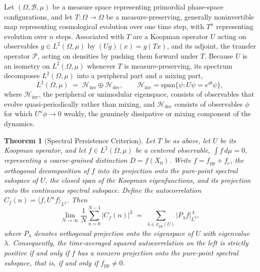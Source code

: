 \documentclass[11pt]{article}
\newtheorem{theorem}{Theorem}
\begin{document}
Let $(\Omega, \mathcal B, \mu)$ be a measure space representing primordial phase-space configurations, and let $T : \Omega \to \Omega$ be a measure-preserving, generally noninvertible map representing cosmological evolution over one time step, with $T^n$ representing evolution over $n$ steps. Associated with $T$ are a Koopman operator $U$ acting on observables $g \in L^2(\Omega, \mu)$ by $(Ug)(x) = g(Tx)$, and its adjoint, the transfer operator $\mathcal P$, acting on densities by pushing them forward under $T$. Because $U$ is an isometry on $L^2(\Omega, \mu)$ whenever $T$ is measure-preserving, its spectrum decomposes $L^2(\Omega, \mu)$ into a peripheral part and a mixing part,
\begin{equation}
L^2(\Omega, \mu) \;=\; \mathcal H_{\mathrm{inv}} \oplus \mathcal H_{\mathrm{dec}}, \qquad \mathcal H_{\mathrm{inv}} = \mathrm{span}\{\psi : U\psi = e^{i\theta}\psi\},
\end{equation}
where $\mathcal H_{\mathrm{inv}}$, the peripheral or unimodular eigenspace, consists of observables that evolve quasi-periodically rather than mixing, and $\mathcal H_{\mathrm{dec}}$ consists of observables $\phi$ for which $U^n\phi \to 0$ weakly, the genuinely dissipative or mixing component of the dynamics.

\begin{theorem}[Spectral Persistence Criterion]
Let $T$ be as above, let $U$ be its Koopman operator, and let $f \in L^2(\Omega, \mu)$ be a centered observable, $\int f \, d\mu = 0$, representing a coarse-grained distinction $D = f(X_0)$. Write $f = f_{\mathrm{pp}} + f_{\mathrm c}$, the orthogonal decomposition of $f$ into its projection onto the pure-point spectral subspace of $U$, the closed span of the Koopman eigenfunctions, and its projection onto the continuous spectral subspace. Define the autocorrelation $C_f(n) = \langle f, U^n f \rangle_{L^2}$. Then
\begin{equation}
\lim_{N \to \infty} \frac{1}{N} \sum_{n=0}^{N-1} |C_f(n)|^2 \;=\; \sum_{\lambda \in \sigma_{\mathrm{pp}}(U)} \big|P_\lambda f\big|_{L^2}^{\,4},
\label{eq:wiener-persistence}
\end{equation}
where $P_\lambda$ denotes orthogonal projection onto the eigenspace of $U$ with eigenvalue $\lambda$. Consequently, the time-averaged squared autocorrelation on the left is strictly positive if and only if $f$ has a nonzero projection onto the pure-point spectral subspace, that is, if and only if $f_{\mathrm{pp}} \neq 0$.
\end{theorem}
\end{document}
